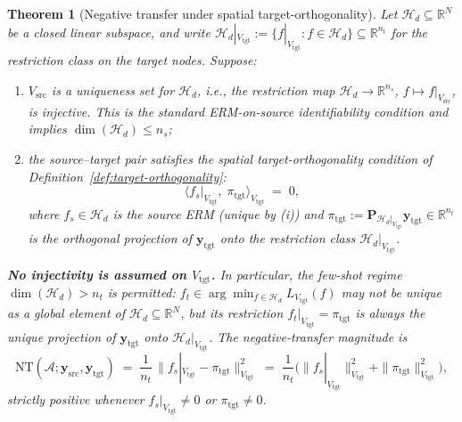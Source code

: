 \documentclass[11pt,a4paper]{article}
\theoremstyle{plain}
\newtheorem{theorem}{Theorem}
\theoremstyle{definition}
\theoremstyle{remark}
\newcommand{\by}{\mathbf{y}}
\newcommand{\bP}{\mathbf{P}}
\newcommand{\R}{\mathbb{R}}
\newcommand{\Acal}{\mathcal{A}}
\newcommand{\Hcal}{\mathcal{H}}
\begin{document}
\begin{theorem}[Negative transfer under spatial target-orthogonality]
\label{thm:negative-transfer-linear-algebra}
Let $\Hcal_d \subseteq \R^N$ be a closed linear subspace, and
write $\Hcal_d|_{V_{\mathrm{tgt}}} := \{f|_{V_{\mathrm{tgt}}} : f
\in \Hcal_d\} \subseteq \R^{n_t}$ for the restriction class on
the target nodes. Suppose:
\begin{enumerate}[label=(\roman*),leftmargin=*]
\item $V_{\mathrm{src}}$ is a uniqueness set for $\Hcal_d$,
    i.e., the restriction map $\Hcal_d \to \R^{n_s}$,
    $f \mapsto f|_{V_{\mathrm{src}}}$, is injective. This is the
    standard ERM-on-source identifiability condition and implies
    $\dim(\Hcal_d) \le n_s$;
\item the source--target pair satisfies the spatial
    target-orthogonality condition of
    Definition~\ref{def:target-orthogonality}:
    \[
        \big\langle f_s|_{V_{\mathrm{tgt}}},\;
            \pi_{\mathrm{tgt}}\big\rangle_{V_{\mathrm{tgt}}}
        \;=\; 0,
    \]
    where $f_s \in \Hcal_d$ is the source ERM (unique by (i)) and
    $\pi_{\mathrm{tgt}} := \bP_{\Hcal_d|_{V_{\mathrm{tgt}}}}
    \by_{\mathrm{tgt}} \in \R^{n_t}$ is the orthogonal projection
    of $\by_{\mathrm{tgt}}$ onto the restriction class
    $\Hcal_d|_{V_{\mathrm{tgt}}}$.
\end{enumerate}
\textbf{No injectivity is assumed on $V_{\mathrm{tgt}}$.} In
particular, the few-shot regime $\dim(\Hcal_d) > n_t$ is
permitted: $f_t \in \arg\min_{f \in \Hcal_d}
L_{V_{\mathrm{tgt}}}(f)$ may not be unique as a global element of
$\Hcal_d \subseteq \R^N$, but its restriction
$f_t|_{V_{\mathrm{tgt}}} = \pi_{\mathrm{tgt}}$ is always the
unique projection of $\by_{\mathrm{tgt}}$ onto
$\Hcal_d|_{V_{\mathrm{tgt}}}$. The negative-transfer magnitude is
\begin{equation}
    \mathrm{NT}(\Acal; \by_{\mathrm{src}}, \by_{\mathrm{tgt}})
    \;=\; \frac{1}{n_t}\,\big\|
        f_s|_{V_{\mathrm{tgt}}} - \pi_{\mathrm{tgt}}
    \big\|^2_{V_{\mathrm{tgt}}}
    \;=\; \frac{1}{n_t}\Big(
        \|f_s|_{V_{\mathrm{tgt}}}\|^2_{V_{\mathrm{tgt}}}
        + \|\pi_{\mathrm{tgt}}\|^2_{V_{\mathrm{tgt}}}
        \Big),
    \label{eq:nt-lower-bound}
\end{equation}
strictly positive whenever $f_s|_{V_{\mathrm{tgt}}} \neq 0$ or
$\pi_{\mathrm{tgt}} \neq 0$.
\end{theorem}
\end{document}
